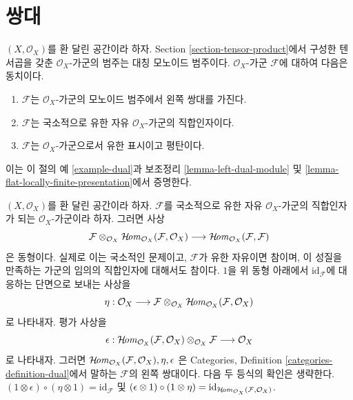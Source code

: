 \section{쌍대}
\label{section-duals}

\noindent
$(X, \mathcal{O}_X)$를 환 달린 공간이라 하자. Section
\ref{section-tensor-product}에서 구성한 텐서곱을 갖춘
$\mathcal{O}_X$-가군의 범주는 대칭 모노이드 범주이다.
$\mathcal{O}_X$-가군 $\mathcal{F}$에 대하여 다음은 동치이다.
\begin{enumerate}
\item $\mathcal{F}$는 $\mathcal{O}_X$-가군의 모노이드 범주에서
왼쪽 쌍대를 가진다.
\item $\mathcal{F}$는 국소적으로 유한 자유 $\mathcal{O}_X$-가군의
직합인자이다.
\item $\mathcal{F}$는 $\mathcal{O}_X$-가군으로서 유한 표시이고 평탄이다.
\end{enumerate}
이는 이 절의 예 \ref{example-dual}과 보조정리
\ref{lemma-left-dual-module} 및
\ref{lemma-flat-locally-finite-presentation}에서 증명한다.

\begin{example}
\label{example-dual}
$(X, \mathcal{O}_X)$를 환 달린 공간이라 하자. $\mathcal{F}$를
국소적으로 유한 자유 $\mathcal{O}_X$-가군의 직합인자가 되는
$\mathcal{O}_X$-가군이라 하자. 그러면 사상
$$
\mathcal{F} \otimes_{\mathcal{O}_X}
\mathop{\mathcal{H}\!\mathit{om}}\nolimits_{\mathcal{O}_X}(\mathcal{F}, \mathcal{O}_X)
\longrightarrow
\mathop{\mathcal{H}\!\mathit{om}}\nolimits_{\mathcal{O}_X}(\mathcal{F}, \mathcal{F})
$$
은 동형이다. 실제로 이는 국소적인 문제이고, $\mathcal{F}$가 유한 자유이면
참이며, 이 성질을 만족하는 가군의 임의의 직합인자에 대해서도 참이다.
$1$을 위 동형 아래에서 $\text{id}_\mathcal{F}$에 대응하는 단면으로 보내는
사상을
$$
\eta :
\mathcal{O}_X
\longrightarrow
\mathcal{F} \otimes_{\mathcal{O}_X}
\mathop{\mathcal{H}\!\mathit{om}}\nolimits_{\mathcal{O}_X}(\mathcal{F}, \mathcal{O}_X)
$$
로 나타내자. 평가 사상을
$$
\epsilon : 
\mathop{\mathcal{H}\!\mathit{om}}\nolimits_{\mathcal{O}_X}(\mathcal{F}, \mathcal{O}_X)
\otimes_{\mathcal{O}_X} \mathcal{F}
\longrightarrow
\mathcal{O}_X
$$
로 나타내자. 그러면
$\mathop{\mathcal{H}\!\mathit{om}}\nolimits_{\mathcal{O}_X}(\mathcal{F}, \mathcal{O}_X), \eta, \epsilon$
은 Categories, Definition \ref{categories-definition-dual}에서 말하는
$\mathcal{F}$의 왼쪽 쌍대이다. 다음 두 등식의 확인은 생략한다.
$(1 \otimes \epsilon) \circ (\eta \otimes 1) = \text{id}_\mathcal{F}$
및
$(\epsilon \otimes 1) \circ (1 \otimes \eta) =
\text{id}_{\mathop{\mathcal{H}\!\mathit{om}}\nolimits_{\mathcal{O}_X}(\mathcal{F}, \mathcal{O}_X)}$.
\end{example}

